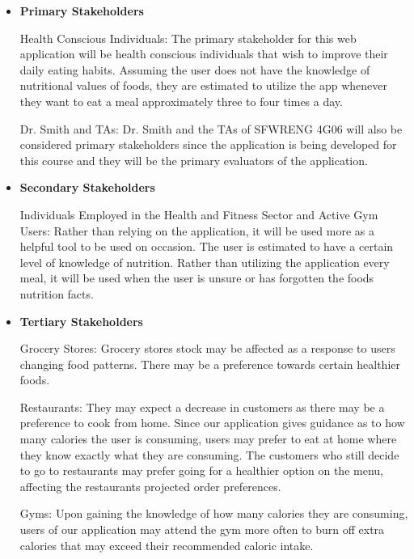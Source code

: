 \documentclass{article}
\begin{document}
\begin{itemize}
	\item \textbf{Primary Stakeholders} 

	\subitem Health Conscious Individuals: The primary stakeholder for this web application will be health conscious individuals that wish to improve their daily eating habits. Assuming the user does not have the knowledge of nutritional values of foods, they are estimated to utilize the app whenever they want to eat a meal approximately three to four times a day.

	\subitem Dr. Smith and TAs: Dr. Smith and the TAs of SFWRENG 4G06 will also be considered primary stakeholders since the application is being developed for this course and they will be the primary evaluators of the application.\newline
	
	\item \textbf{Secondary Stakeholders} 

	\subitem Individuals Employed in the Health and Fitness Sector and Active Gym Users: Rather than relying on the application, it will be used more as a helpful tool to be used on occasion. The user is estimated to have a certain level of knowledge of nutrition. Rather than utilizing the application every meal, it will be used when the user is unsure or has forgotten the foods nutrition facts.\newline

	\item \textbf{Tertiary Stakeholders} 

	\subitem Grocery Stores: Grocery stores stock may be affected as a response to users changing food patterns. There may be a preference towards certain healthier foods.

	\subitem Restaurants: They may expect a decrease in customers as there may be a preference to cook from home. Since our application gives guidance as to how many calories the user is consuming, users may prefer to eat at home where they know exactly what they are consuming. The customers who still decide to go to restaurants may prefer going for a healthier option on the menu, affecting the restaurants projected order preferences.

	\subitem Gyms: Upon gaining the knowledge of how many calories they are consuming, users of our application may attend the gym more often to burn off extra calories that may exceed their recommended caloric intake. 

\end{itemize}
\end{document}

